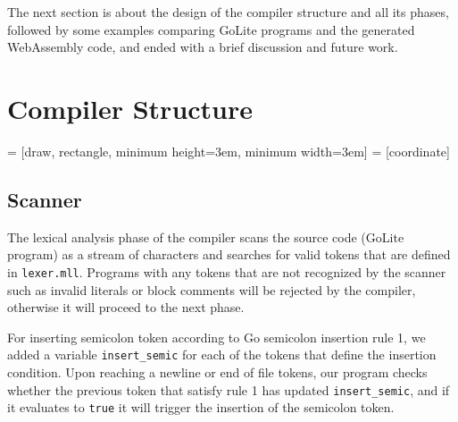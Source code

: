 \documentclass{article}
\begin{document}
The next section is about the design of the compiler structure and all its phases, followed by some examples comparing GoLite programs and the generated WebAssembly code, and ended with a brief discussion and future work.

\section{Compiler Structure}
\begin{center}
 = [draw, rectangle, minimum height=3em, minimum width=3em]
 = [coordinate]
\end{center}

\subsection{Scanner}
The lexical analysis phase of the compiler scans the source code (GoLite program) as a stream of characters and searches for valid tokens that are defined in \verb|lexer.mll|. Programs with any tokens that are not recognized by the scanner such as invalid literals or block comments will be rejected by the compiler, otherwise it will proceed to the next phase.

For inserting semicolon token according to Go semicolon insertion rule 1, we added a variable \verb|insert_semic| for each of the tokens that define the insertion condition. Upon reaching a newline or end of file tokens, our program checks whether the previous token that satisfy rule 1 has updated \verb|insert_semic|, and if it evaluates to \verb|true| it will trigger the insertion of the semicolon token.
\end{document}
